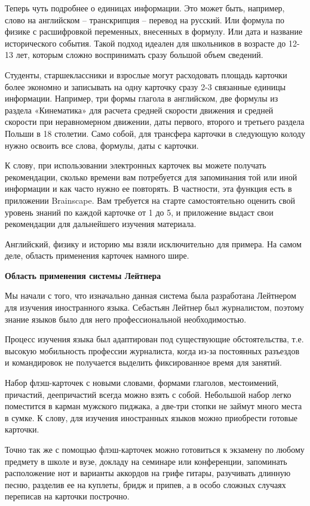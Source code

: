 Теперь чуть подробнее о единицах информации. Это может быть, например, слово на английском – транскрипция – перевод на русский. Или формула по физике с расшифровкой переменных, внесенных в формулу. Или дата и название исторического события. Такой подход идеален для школьников в возрасте до 12-13 лет, которым сложно воспринимать сразу большой объем сведений.

Студенты, старшеклассники и взрослые могут расходовать площадь карточки более экономно и записывать на одну карточку сразу 2-3 связанные единицы информации. Например, три формы глагола в английском, две формулы из раздела «Кинематика» для расчета средней скорости движения и средней скорости при неравномерном движении, даты первого, второго и третьего раздела Польши в 18 столетии. Само собой, для трансфера карточки в следующую колоду нужно освоить все слова, формулы, даты с карточки.

К слову, при использовании электронных карточек вы можете получать рекомендации, сколько времени вам потребуется для запоминания той или иной информации и как часто нужно ее повторять. В частности, эта функция есть в приложении Brainscape. Вам требуется на старте самостоятельно оценить свой уровень знаний по каждой карточке от 1 до 5, и приложение выдаст свои рекомендации для дальнейшего изучения материала.

Английский, физику и историю мы взяли исключительно для примера. На самом деле, область применения карточек намного шире.

\textbf{Область применения системы Лейтнера}

Мы начали с того, что изначально данная система была разработана Лейтнером для изучения иностранного языка. Себастьян Лейтнер был журналистом, поэтому знание языков было для него профессиональной необходимостью.

Процесс изучения языка был адаптирован под существующие обстоятельства, т.е. высокую мобильность профессии журналиста, когда из-за постоянных разъездов и командировок не получается выделить фиксированное время для занятий.

Набор флэш-карточек с новыми словами, формами глаголов, местоимений, причастий, деепричастий всегда можно взять с собой. Небольшой набор легко поместится в карман мужского пиджака, а две-три стопки не займут много места в сумке. К слову, для изучения иностранных языков можно приобрести готовые карточки.

Точно так же с помощью флэш-карточек можно готовиться к экзамену по любому предмету в школе и вузе, докладу на семинаре или конференции, запоминать расположение нот и варианты аккордов на грифе гитары, разучивать длинную песню, разделив ее на куплеты, бридж и припев, а в особо сложных случаях переписав на карточки построчно.


